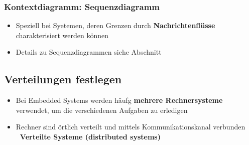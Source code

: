\subsubsection{Kontextdiagramm: Sequenzdiagramm}

\begin{itemize}
    \item Speziell bei Syetemen, deren Grenzen durch \textbf{Nachrichtenflüsse} charakterisiert werden können
    \item Details zu Sequenzdiagrammen siehe Abschnitt %
\end{itemize}


\subsection{Verteilungen festlegen}

\begin{itemize}
    \item Bei Embedded Systems werden häufg \textbf{mehrere Rechnersysteme} verwendet, um die verschiedenen Aufgaben zu erledigen
    \item Rechner sind örtlich verteilt und mittels Kommunikationskanal verbunden \\
        \textbf{\textrightarrow\ Verteilte Systeme (distributed systems)}
\end{itemize}

\vspace{0.2cm}

